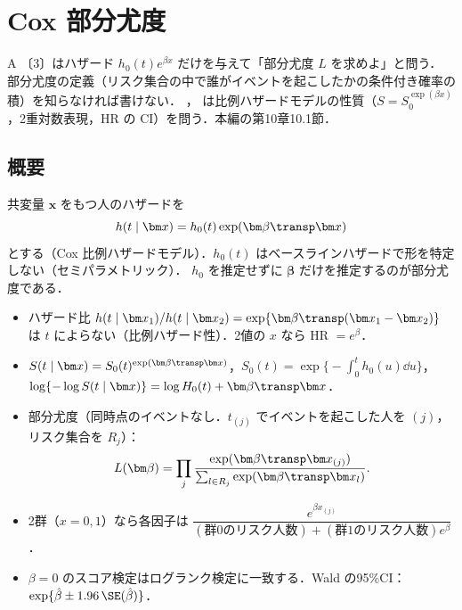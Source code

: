 \chapter{Cox 部分尤度}\label{ch:m03}

\begin{priobox}{A}
〔3〕はハザード $h_0(t)e^{\beta x}$ だけを与えて「部分尤度 $L$ を求めよ」と問う．
部分尤度の定義（リスク集合の中で誰がイベントを起こしたかの条件付き確率の積）を知らなければ書けない．
， は比例ハザードモデルの性質（$S=S_0^{\exp(\beta x)}$，2重対数表現，HR の CI）を問う．本編の第10章10.1節．
\end{priobox}

\section{概要}\label{sec:m03-gaiyo}
共変量 $\bm x$ をもつ人のハザードを
\[
h(t\mid\bm x)=h_0(t)\exp(\bm\beta\transp\bm x)
\]
とする（Cox 比例ハザードモデル）．$h_0(t)$ はベースラインハザードで形を特定しない（セミパラメトリック）．
$h_0$ を推定せずに $\bm\beta$ だけを推定するのが部分尤度である．

\begin{pointbox}[覚える式]
\begin{itemize}
\item ハザード比 $h(t\mid\bm x_1)/h(t\mid\bm x_2)=\exp\{\bm\beta\transp(\bm x_1-\bm x_2)\}$ は $t$ によらない（比例ハザード性）．2値の $x$ なら HR $=e^\beta$．
\item $S(t\mid\bm x)=S_0(t)^{\exp(\bm\beta\transp\bm x)}$，\quad $S_0(t)=\exp\bigl\{-\int_0^th_0(u)\dd u\bigr\}$，\quad
      $\log\{-\log S(t\mid\bm x)\}=\log H_0(t)+\bm\beta\transp\bm x$．
\item 部分尤度（同時点のイベントなし．$t_{(j)}$ でイベントを起こした人を $(j)$，リスク集合を $R_j$）：
\[
L(\bm\beta)=\prod_{j}\frac{\exp(\bm\beta\transp\bm x_{(j)})}{\sum_{l\in R_j}\exp(\bm\beta\transp\bm x_l)} .
\]
\item 2群（$x=0,1$）なら各因子は $\dfrac{e^{\beta x_{(j)}}}{(\text{群0のリスク人数})+(\text{群1のリスク人数})e^\beta}$．
\item $\beta=0$ のスコア検定はログランク検定に一致する．Wald の95\%CI：$\exp\{\hat\beta\pm1.96\,\SE(\hat\beta)\}$．
\end{itemize}
\end{pointbox}

